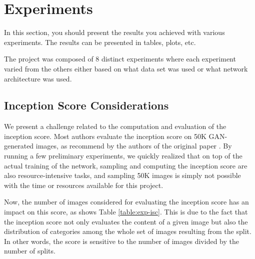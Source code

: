 
\section{Experiments}
In this section, you should
present the results you achieved with various experiments. The results
can be presented in tables, plots, etc. 

The project was composed of 8 distinct experiments where each experiment varied from the others either based on what data set was used or what network architecture was used.

\subsection{Inception Score Considerations}
We present a challenge related to the computation and evaluation of the inception score. Most authors evaluate the inception score on 50K GAN-generated images, as recommend by the authors of the original paper \cite{salimans2016improved}. By running a few preliminary experiments, we quickly realized that on top of the actual training of the network, sampling and computing the inception score are also resource-intensive tasks, and sampling 50K images is simply not possible with the time or resources available for this project.

Now, the number of images considered for evaluating the inception score has an impact on this score, as shows Table \ref{table:exp-isc}. This is due to the fact that the inception score not only evaluates the content of a given image but also the distribution of categories among the whole set of images resulting from the split. In other words, the score is sensitive to the number of images divided by the number of splits. 

